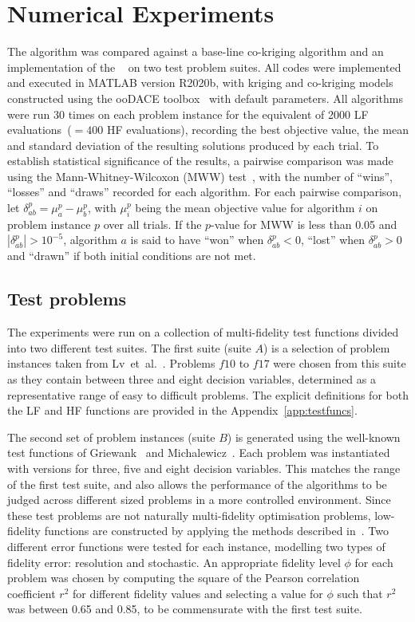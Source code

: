 \section{Numerical Experiments}\label{sec:exp}

The \AlgName{} algorithm was compared against a base-line co-kriging algorithm and an implementation of the \motos{}~\cite{xu2016mo2tos} on two test problem suites. All codes were implemented and executed in MATLAB version R2020b, with kriging and co-kriging models constructed using the ooDACE toolbox~\cite{oodace} with default parameters.
All algorithms were run 30 times on each problem instance for the equivalent of 2000 LF evaluations~($=400$ HF evaluations), recording the best objective value, the mean and standard deviation of the resulting solutions produced by each trial. To establish statistical significance of the results, a pairwise comparison was made using the Mann-Whitney-Wilcoxon (MWW) test~\cite{mann1947test}, with the number of ``wins'', ``losses'' and ``draws'' recorded for each algorithm. For each pairwise comparison, let $\delta^p_{ab} = \mu^p_a - \mu^p_b$, with $\mu^p_i$ being the mean objective value for algorithm $i$ on problem instance $p$ over all trials. If the $p$-value for MWW is less than 0.05 and $|\delta^p_{ab}| > 10^{-5}$, algorithm $a$ is said to have ``won'' when $\delta^p_{ab} < 0$, ``lost'' when $\delta^p_{ab} > 0$ and ``drawn'' if both initial conditions are not met.

\subsection{Test problems}
The experiments were run on a collection of multi-fidelity test functions divided into two different test suites. The first suite (suite $A$) is a selection of problem instances taken from Lv~et~al.~\cite{lv2021multi}. Problems $f10$ to $f17$ were chosen from this suite as they contain between three and eight decision variables, determined as a representative range of easy to difficult problems. The explicit definitions for both the LF and HF functions are provided in the Appendix~\ref{app:testfuncs}.

The second set of problem instances (suite $B$) is generated using the well-known test functions of Griewank~\cite{griewank1981generalized} and Michalewicz~\cite{michalewicz2013genetic}. Each problem was instantiated with versions for three, five and eight decision variables. This matches the range of the first test suite, and also allows the performance of the algorithms to be judged across different sized problems in a more controlled environment. Since these test problems are not naturally multi-fidelity optimisation problems, low-fidelity functions are constructed by applying the methods described in~\cite{wang2017generic}. Two different error functions were tested for each instance, modelling two types of fidelity error: resolution and stochastic. An appropriate fidelity level $\phi$ for each problem was chosen by computing the square of the Pearson correlation coefficient $r^2$ for different fidelity values and selecting a value for $\phi$ such that $r^2$ was between 0.65 and 0.85, to be commensurate with the first test suite.

